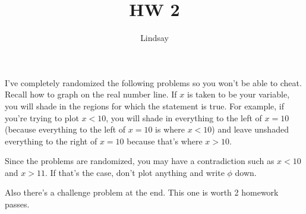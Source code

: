 \documentclass[12pt]{article}
\begin{document}
			\title{HW 2}
			\author{Lindsay}
			\date{}
			\maketitle
I've completely randomized the following problems so you won't be able to cheat. Recall how to 
graph on the real number line. If $x$ is taken
to be your variable, you will shade in the regions for which the statement is true. For example, if you're
trying to plot $x < 10$, you will shade in everything to the left of $x = 10$ (because everything to the 
left of $x = 10$ is where $x < 10$) and leave unshaded everything to the right of $x = 10$ because that's where
$x > 10$.

Since the problems are randomized, you may have a contradiction such as $x < 10$ and $x > 11$. If that's the case,
don't plot anything and write $\phi$ down.

Also there's a challenge problem at the end. This one is worth 2 homework passes.
\end{document}
